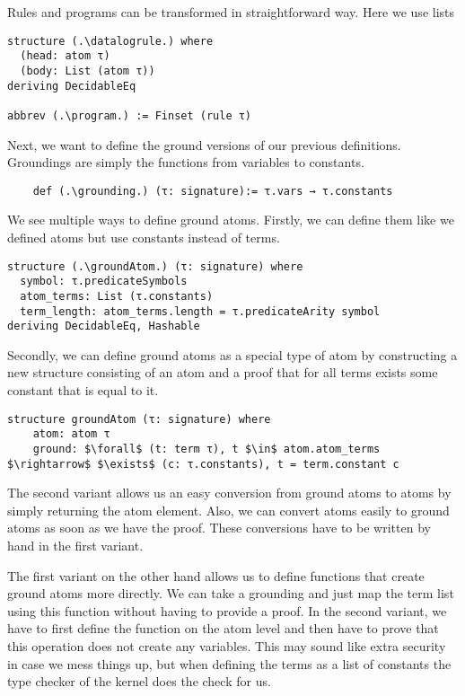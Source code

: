 Rules and programs can be transformed in straightforward way. Here we use lists 

\begin{lstlisting}
structure (.\datalogrule.) where
  (head: atom τ)
  (body: List (atom τ))
deriving DecidableEq

abbrev (.\program.) := Finset (rule τ)
\end{lstlisting}

Next, we want to define the ground versions of our previous definitions. Groundings are simply the functions from variables to constants.

\begin{lstlisting}
    def (.\grounding.) (τ: signature):= τ.vars → τ.constants
\end{lstlisting}

We see multiple ways to define ground atoms. Firstly, we can define them like we defined atoms but use constants instead of terms. 

\begin{lstlisting}
structure (.\groundAtom.) (τ: signature) where
  symbol: τ.predicateSymbols
  atom_terms: List (τ.constants)
  term_length: atom_terms.length = τ.predicateArity symbol
deriving DecidableEq, Hashable
\end{lstlisting}

Secondly, we can define ground atoms as a special type of atom by constructing a new structure consisting of an atom and a proof that for all terms exists some constant that is equal to it.

\begin{lstlisting}
structure groundAtom (τ: signature) where
    atom: atom τ
    ground: $\forall$ (t: term τ), t $\in$ atom.atom_terms $\rightarrow$ $\exists$ (c: τ.constants), t = term.constant c
\end{lstlisting}

The second variant allows us an easy conversion from ground atoms to atoms by simply returning the atom element. Also, we can convert atoms easily to ground atoms as soon as we have the proof. These conversions have to be written by hand in the first variant.

The first variant on the other hand allows us to define functions that create ground atoms more directly. We can take a grounding and just map the term list using this function without having to provide a proof. In the second variant, we have to first define the function on the atom level and then have to prove that this operation does not create any variables. This may sound like extra security in case we mess things up, but when defining the terms as a list of constants the type checker of the kernel does the check for us.

